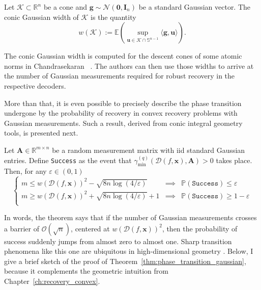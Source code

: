 \begin{definition}
    Let $\mathcal{K} \subset \mathbb{R}^{n}$ be a cone and $\mathbf{g} \sim \mathcal{N}(\mathbf{0}, \mathbf{I}_n)$ be a standard Gaussian vector. The conic Gaussian width of $\mathcal{K}$ is the quantity
    \begin{equation}
        w(\mathcal{K}) := \mathbb{E} \left ( \underset{\mathbf{u} \in \mathcal{K} \cap \mathbb{S}^{n-1}}{\sup} \langle \mathbf{g}, \mathbf{u}\rangle \right ).
    \end{equation}
\end{definition}

The conic Gaussian width is computed for the descent cones of some atomic norms in Chandrasekaran \etal~\cite{chandrasekaran2012}. The authors can then use those widths to arrive at the number of Gaussian measurements required for robust recovery in the respective decoders.

More than that, it is even possible to precisely describe the phase transition undergone by the probability of recovery in convex recovery problems with Gaussian measurements. Such a result, derived from conic integral geometry tools, is presented next.

\begin{theorem}
    \label{thm:phase_transition_gaussian}
    Let $\mathbf{A} \in \mathbb{R}^{m \times n}$ be a random measurement matrix with \acrshort{iid} standard Gaussian entries. Define \texttt{Success} as the event that $\gamma_{\min}^{(q)} \left ( \mathcal{D}( f, \mathbf{x}), \mathbf{A} \right ) > 0$ takes place. Then, for any $\varepsilon \in (0, 1)$
    \begin{equation}
        \left \{
        \begin{matrix}
        m \leq w(\mathcal{D}(f, \mathbf{x}))^2 - \sqrt{8 n \log (4 / \varepsilon)} & \implies & \mathbb{P} \left ( \texttt{Success} \right ) \leq \varepsilon \\
        m \geq w(\mathcal{D}(f, \mathbf{x}))^2 + \sqrt{8 n \log (4/\varepsilon)} + 1 & \implies & \mathbb{P} \left ( \texttt{Success} \right ) \geq 1 - \varepsilon \\
        \end{matrix}
        \right.
    \end{equation}
\end{theorem}

In words, the theorem says that if the number of Gaussian measurements crosses a barrier of $\mathcal{O} \left( \sqrt{n} \right)$, centered at $w(\mathcal{D}(f, \mathbf{x}))^2$, then the probability of success suddenly jumps from almost zero to almost one. Sharp transition phenomena like this one are ubiquitous in high-dimensional geometry \cite{donoho2009a,oymak2018}. Below, I give a brief sketch of the proof of Theorem~\ref{thm:phase_transition_gaussian}, because it complements the geometric intuition from Chapter~\ref{ch:recovery_convex}.

